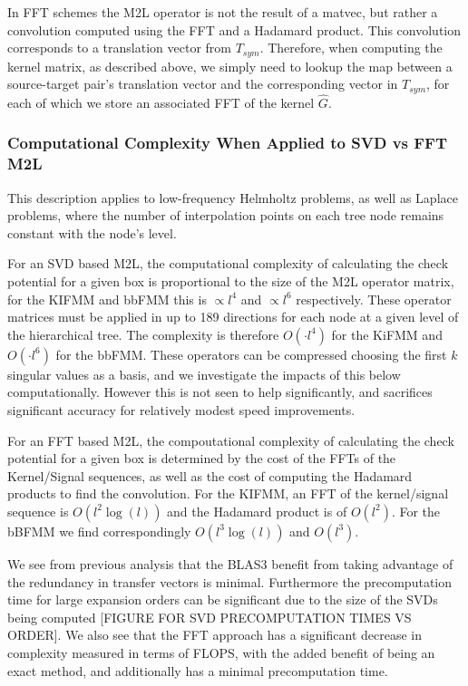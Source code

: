 \documentclass[12pt, a4, twoside]{article}
\begin{document}
In FFT schemes the M2L operator is not the result of a matvec, but rather a convolution computed using the FFT and a Hadamard product. This convolution corresponds to a translation vector from $T_{sym}$. Therefore, when computing the kernel matrix, as described above, we simply need to lookup the map between a source-target pair's translation vector and the corresponding vector in $T_{sym}$, for each of which we store an associated FFT of the kernel $\hat{G}$.

\subsubsection{Computational Complexity When Applied to SVD vs FFT M2L}

This description applies to low-frequency Helmholtz problems, as well as Laplace problems, where the number of interpolation points on each tree node remains constant with the node's level.

For an SVD based M2L, the computational complexity of calculating the check potential for a given box is proportional to the size of the M2L operator matrix, for the KIFMM and bbFMM this is $ \propto l^4$ and $\propto l^6$ respectively. These operator matrices must be applied in up to 189 directions for each node at a given level of the hierarchical tree. The complexity is therefore $O(\cdot l^4)$ for the KiFMM and $O(\cdot l^6)$ for the bbFMM. These operators can be compressed choosing the first $k$ singular values as a basis, and we investigate the impacts of this below computationally. However this is not seen to help significantly, and sacrifices significant accuracy for relatively modest speed improvements.

For an FFT based M2L, the compoutational complexity of calculating the check potential for a given box is determined by the cost of the FFTs of the Kernel/Signal sequences, as well as the cost of computing the Hadamard products to find the convolution. For the KIFMM, an FFT of the kernel/signal sequence is $O(l^2 \log(l))$ and the Hadamard product is of $O(l^2)$. For the bBFMM we find correspondingly $O(l^3 \log(l))$ and $O(l^3)$.

We see from previous analysis that the BLAS3 benefit from taking advantage of the redundancy in transfer vectors is minimal. Furthermore the precomputation time for large expansion orders can be significant due to the size of the SVDs being computed [FIGURE FOR SVD PRECOMPUTATION TIMES VS ORDER]. We also see that the FFT approach has a significant decrease in complexity measured in terms of FLOPS, with the added benefit of being an exact method, and additionally has a minimal precomputation time.
\end{document}
